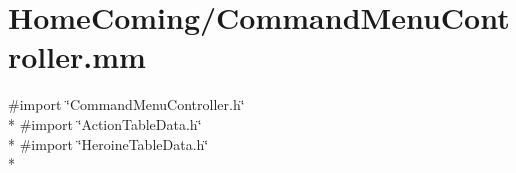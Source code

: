 \hypertarget{_command_menu_controller_8mm}{\section{Home\-Coming/\-Command\-Menu\-Controller.mm}
\label{_command_menu_controller_8mm}
}
{\ttfamily \#import \char`\"{}Command\-Menu\-Controller.\-h\char`\"{}}\\*
{\ttfamily \#import \char`\"{}Action\-Table\-Data.\-h\char`\"{}}\\*
{\ttfamily \#import \char`\"{}Heroine\-Table\-Data.\-h\char`\"{}}\\*
